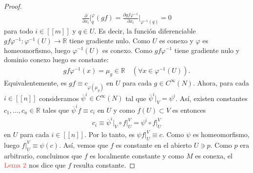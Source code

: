 \documentclass[11pt]{article}
\newcommand{\R}{\mathbb{R}}
\newcommand{\nat}[1]{[\![#1]\!]}
\newcommand{\paint}[2]{\color{#1}{#2}}
\newcommand{\ol}{\overline}
\newcommand{\hook}[3]{\frac{\partial}{\partial x_{#1}}\Big\rvert_{#2}^{#3}}
\begin{document}
\begin{proof}
\begin{align*}
\hook{i}{q}{\varphi}(gf) = \frac{\partial gf\varphi^{-1}}{\partial x_i}\bigg\rvert_{\varphi^{-1}(q)} = 0
\end{align*}
para todo $i \in \nat{m}$ y $q \in U$. Es decir, la funci\'on diferenciable $gf\varphi^{-1} : \varphi^{-1}(U) \to \R$ tiene gradiente nulo. Como $U$ es conexo y $\varphi$ es homeomorfismo, luego $\varphi^{-1}(U)$ es conexo. Como $gf\varphi^{-1}$ tiene gradiente nulo y dominio conexo luego es constante:
\begin{align*}
gf\varphi^{-1}(x) = \mu_{g} \in \R \quad (\forall x \in \varphi^{-1}(U)).
\end{align*}
Equivalentemente, es $gf \equiv c_{\varphi(\mu_g)}$ en $U$ para cada $g \in C^\infty(N)$. Ahora, para cada $i \in \nat{n}$ consideramos $\ol{\psi}^i \in C^\infty(N)$ tal que $\ol{\psi}^i|_V = \psi^i$. As\'i, existen constantes $c_1, \dots, c_n \in \R$ tales que $\ol{\psi}^if \equiv c_i$ en $U$ y como $f(U) \subset V$ es entonces
\begin{align*}
c_i \equiv \ol{\psi}^i|_V \circ f\Big|_U^V = \psi^i \circ f\Big|_U^V
\end{align*}
en $U$ para cada $i \in \nat{n}$. Por lo tanto, es $\psi f \big|_U^V \equiv c$. Como $\psi$ es homeomorfismo, luego $f \big|_U^V \equiv \psi(c)$. As\'i, vemos que $f$ es constante en el abierto $U \ni p$. Como $p$ era arbitrario, concluimos que $f$ es localmente constante y como $M$ es conexa, el $\paint{red}{\text{Lema $2$}}$ nos dice que $f$ resulta constante.
\end{proof}
\end{document}
